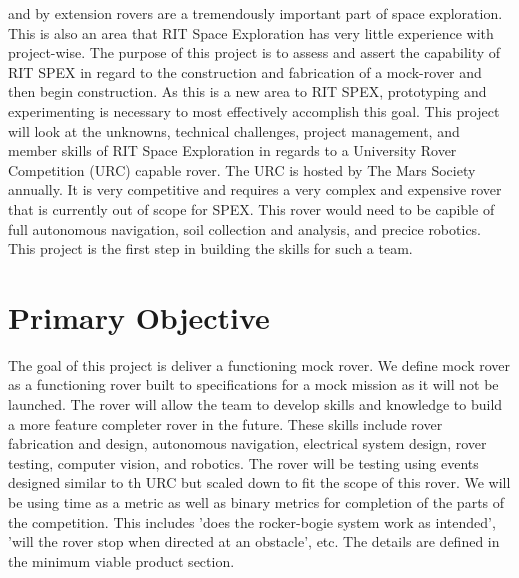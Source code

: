 \documentclass[conference]{IEEEtran} %
\begin{document}
 and by extension rovers are a tremendously important part of space exploration. 
This is also an area that RIT Space Exploration has very little experience with project-wise. 
The purpose of this project is to assess and assert the capability of RIT SPEX in regard to the construction and fabrication of a mock-rover and then begin construction. 
As this is a new area to RIT SPEX, prototyping and experimenting is necessary to most effectively accomplish this goal. 
This project will look at the unknowns, technical challenges, project management, and member skills of RIT Space Exploration in regards to a University Rover Competition (URC) capable rover.
The URC is hosted by The Mars Society annually. 
It is very competitive and requires a very complex and expensive rover that is currently out of scope for SPEX. 
This rover would need to be capible of full autonomous navigation, soil collection and analysis, and precice robotics.
This project is the first step in building the skills for such a team. 

\section{Primary Objective}
\label{sec:primary-obj}

The goal of this project is deliver a functioning mock rover. 
We define mock rover as a functioning rover built to specifications for a mock mission as it will not be launched. 
The rover will allow the team to develop skills and knowledge to build a more feature completer rover in the future. 
These skills include rover fabrication and design, autonomous navigation, electrical system design, rover testing, computer vision, and robotics.
The rover will be testing using events designed similar to th URC but scaled down to fit the scope of this rover. 
We will be using time as a metric as well as binary metrics for completion of the parts of the competition.
This includes 'does the rocker-bogie system work as intended', 'will the rover stop when directed at an obstacle', etc. 
The details are defined in the minimum viable product section. 
\end{document}
